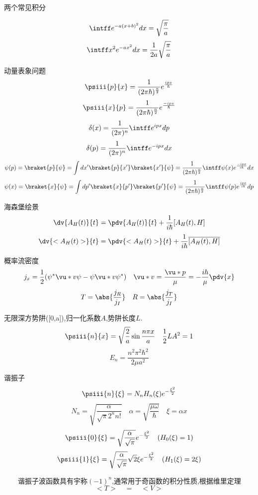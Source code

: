 \begin{formal}
\begin{enumerate}
                两个常见积分

                $$ \intff e^{-a (x+b)^{2}} dx = \sqrt{\frac{\pi}{a}} $$
                $$ \intff x^{2} e^{-a x^{2}} dx = \frac{1}{2a} \sqrt{\frac{\pi}{a}} $$

                动量表象问题
                $$ \psiii{p}{x} = \frac{1}{(2 \pi \hbar)^{\frac{n}{2}}} e^{\frac{ipx}{\hbar}} $$ 
                $$ \psiii{x}{p} = \frac{1}{(2 \pi \hbar)^{\frac{n}{2}}} e^{\frac{-ipx}{\hbar}} $$ 
                $$ \delta(x) = \frac{1}{(2\pi)^{n}} \intff e^{ipx} dp $$
                $$ \delta(p) = \frac{1}{(2\pi)^{n}} \intff e^{-ipx} dx $$
                $$ \psi(p) = \braket{p}{\psi} = \int dx' \braket{p}{x'} \braket{x'}{\psi} = \frac{1}{(2 \pi \hbar)^{\frac{n}{2}}} \intff \psi(x) e^{\frac{-ipx}{i\hbar}} dx $$
                $$ \psi(x) = \braket{x}{\psi} = \int dp' \braket{x}{p'} \braket{p'}{\psi} = \frac{1}{(2 \pi \hbar)^{\frac{n}{2}}} \intff \psi(p) e^{\frac{ipx}{i\hbar}}  dp $$

                海森堡绘景
                $$ \dv{A_{H}(t)}{t} = \pdv{A_{H}(t)}{t} + \frac{1}{i\hbar} [A_{H}(t),H] $$
                $$ \dv{<A_{H}(t)>}{t} = \pdv{<A_{H}(t)>}{t} + \frac{1}{i\hbar} \overline{[A_{H}(t),H]} $$

                概率流密度
                $$ j_{x} = \frac{1}{2} (\psi^{*} \vu*{v} \psi - \psi \vu*{v} \psi^{*} ) \quad \vu*{v} = \frac{\vu*{p}}{\mu} = - \frac{i\hbar}{\mu} \pdv{x} $$
                $$ T = \abs{\frac{j_{R}}{j_{I}}} \quad R = \abs{\frac{j_{T}}{j_{I}}} $$

                无限深方势阱([0,a]),归一化系数$A$,势阱长度$L$.
                $$ \psiii{n}{x} = \sqrt{\frac{2}{a}} \sin{\frac{n\pi x}{a}} \quad \frac{1}{2} L A^{2}  = 1 $$
                $$ E_{n} = \dfrac{n^{2}\pi^{2}\hbar^{2}}{2\mu a^{2}} $$

                谐振子
                $$ \psiii{n}{\xi} = N_{n} H_{n}(\xi) e^{-\frac{\xi^{2}}{2}} $$
                $$ N_{n} = \sqrt{\frac{\alpha}{\sqrt{\pi}2^{n} n!}}  \quad \alpha = \sqrt{\frac{\mu \omega}{\hbar}} \quad \xi = \alpha x $$
                $$ \psiii{0}{\xi} = \sqrt{\frac{\alpha}{\sqrt{\pi}}} e^{-\frac{\xi^{2}}{2}} \quad (H_{0}(\xi) = 1)$$
                $$ \psiii{1}{\xi} = \sqrt{\frac{\alpha}{\sqrt{\pi}}} \sqrt{2} \xi e^{-\frac{\xi^{2}}{2}} \quad (H_{1}(\xi) = 2\xi) $$
                
                $\qquad$谐振子波函数具有宇称$(-1)^{n}$,通常用于奇函数的积分性质,根据维里定理
                $$  < T > \quad = \quad  < V >  $$
                

\end{enumerate}
\end{formal}
